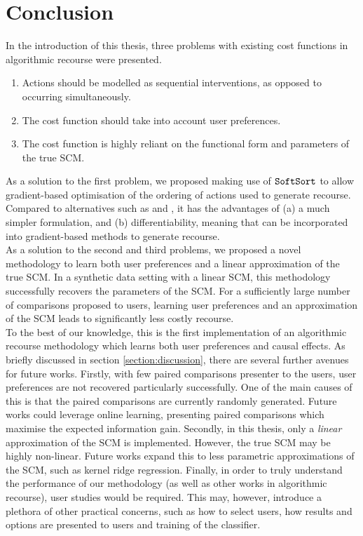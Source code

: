 \chapter{Conclusion} \label{chapter:conclusion}

In the introduction of this thesis, three problems with existing cost functions in algorithmic recourse were presented. \\

\begin{enumerate}
	\item Actions should be modelled as sequential interventions, as opposed to occurring simultaneously.
	\item The cost function should take into account user preferences.
	\item The cost function is highly reliant on the functional form and parameters of the true SCM.
\end{enumerate}
\bigskip

As a solution to the first problem, we proposed making use of $\operatorname*{\texttt{SoftSort}}$ \citep{prilloSoftSortContinuousRelaxation2020} to allow gradient-based optimisation of the ordering of actions used to generate recourse. Compared to alternatives such as \textcite{naumannConsequenceAwareSequentialCounterfactual2021} and \textcite{detoniSynthesizingExplainableCounterfactual2023}, it has the advantages of (a) a much simpler formulation, and (b) differentiability, meaning that can be incorporated into gradient-based methods to generate recourse.\\

As a solution to the second and third problems, we proposed a novel methodology to learn both user preferences and a linear approximation of the true SCM. In a synthetic data setting with a linear SCM, this methodology successfully recovers the parameters of the SCM. For a sufficiently large number of comparisons proposed to users, learning user preferences and an approximation of the SCM leads to significantly less costly recourse. \\

To the best of our knowledge, this is the first implementation of an algorithmic recourse methodology which learns both user preferences and causal effects. As briefly discussed in section \ref{section:discussion}, there are several further avenues for future works. Firstly, with few paired comparisons presenter to the users, user preferences are not recovered particularly successfully. One of the main causes of this is that the paired comparisons are currently randomly generated. Future works could leverage online learning, presenting paired comparisons which maximise the expected information gain. Secondly, in this thesis, only a \textit{linear} approximation of the SCM is implemented. However, the true SCM may be highly non-linear. Future works expand this to less parametric approximations of the SCM, such as kernel ridge regression. Finally, in order to truly understand the performance of our methodology (as well as other works in algorithmic recourse), user studies would be required. This may, however, introduce a plethora of other practical concerns, such as how to select users, how results and options are presented to users and training of the classifier.